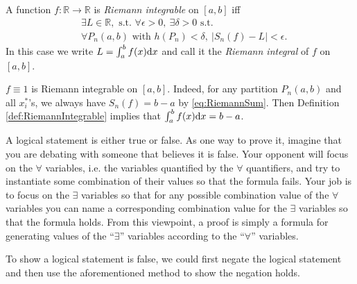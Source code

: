 \begin{defn}
  \label{def:RiemannIntegrable}
  A function $f: \mathbb{R}\rightarrow \mathbb{R}$
  is  %
  \emph{Riemann integrable} on  $[a, b]$
  iff %
  \begin{align}
    \nonumber
    &\exists L\in\mathbb{R}, \text{ s.t. }
      \forall \epsilon>0,\ \exists \delta>0 \text{ s.t. }
    \\ \label{eq:RiemannIntegrable}
    & \forall P_n(a,b) \text{ with } h(P_n)<\delta,\ 
      |S_n(f)-L|<\epsilon.
  \end{align}
  In this case we write $L=\int_a^b f(x) \mathrm{d} x$
  and call it the \emph{Riemann integral} of $f$ on $[a,b]$.
\end{defn}

\begin{exm}
  $f\equiv 1$ is Riemann integrable on $[a,b]$. Indeed,
  for any partition $P_{n}(a,b)$ and all $x_{i}^{*}$'s,
  we always have $S_{n}(f)=b-a$ by \eqref{eq:RiemannSum}. Then
  Definition \ref{def:RiemannIntegrable} implies that
  $\int_{a}^{b}f(x)\mathrm{d} x=b-a$.
\end{exm}


\begin{rem}
  A logical statement is either true or false.
  As one way to prove it,
   imagine that you are debating with someone
   that believes it is false.
  Your opponent will focus on the $\forall$ variables,
   i.e. the variables quantified by the
   $\forall$ quantifiers, 
   and try to instantiate some combination of their values 
   so that the formula fails.
  Your job is to focus on the $\exists$ variables
   so that for any possible combination value of the $\forall$ variables
   you can name a corresponding combination value
   for the $\exists$ variables so that the formula holds.
  From this viewpoint, a proof is simply a formula
   for generating values of the ``$\exists$'' variables
   according to the ``$\forall$'' variables.

  To show a logical statement is false,
   we could first negate the logical statement
   and then use the aforementioned method to show the negation holds.
\end{rem}

